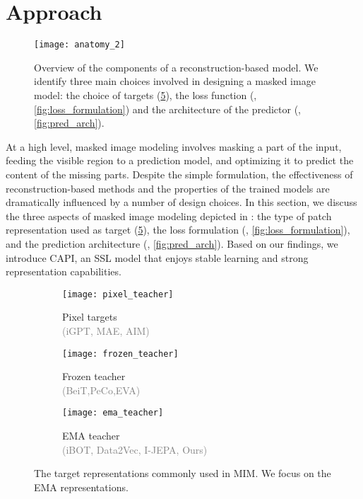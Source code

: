\section{Approach}
\label{sec:approach}

\begin{figure}[t]
  \centering
  \texttt{[image: anatomy\_2]}
  \caption{
    Overview of the components of a reconstruction-based model.
    We identify three main choices involved in designing a masked image model:
    the choice of targets (\cref{fig:target_repr}), the loss function (, \cref{fig:loss_formulation}) and the architecture of the predictor (, \cref{fig:pred_arch}).
  }
  \label{fig:anatomy}
\end{figure}

At a high level, masked image modeling involves masking a part of the input, feeding the visible region to a prediction model, and optimizing it to predict the content of the missing parts.
Despite the simple formulation, the effectiveness of reconstruction-based methods and the properties of the trained models are dramatically influenced by a number of design choices.
In this section, we discuss the three aspects of masked image modeling depicted in : the type of patch representation used as target (\cref{fig:target_repr}), the loss formulation (, \cref{fig:loss_formulation}), and the prediction architecture (, \cref{fig:pred_arch}).
Based on our findings, we introduce CAPI, an SSL model that enjoys stable learning and strong representation capabilities.

\captionsetup[subfigure]{justification=centering}
\begin{figure}[b]
\centering
\hfill
\begin{subfigure}[b]{0.32\linewidth}
  \centering
    \texttt{[image: pixel\_teacher]}
    \caption{Pixel targets\\\textcolor{gray}{(iGPT, MAE, AIM)}}
    \label{fig:target_repr:pixel}
\end{subfigure}
\hfill
\begin{subfigure}[b]{0.32\linewidth}
  \centering
    \texttt{[image: frozen\_teacher]}
    \caption{Frozen teacher\\\textcolor{gray}{(BeiT,PeCo,EVA)}}
    \label{fig:target_repr:frozen}
\end{subfigure}
\hfill
\begin{subfigure}[b]{0.32\linewidth}
  \centering
    \texttt{[image: ema\_teacher]}
    \caption{EMA teacher\\\textcolor{gray}{(iBOT, Data2Vec, I-JEPA, Ours)}}
    \label{fig:target_repr:ema}
\end{subfigure}
\caption{
The target representations commonly used in MIM.
We focus on the EMA representations.
}
\label{fig:target_repr}
\end{figure}

